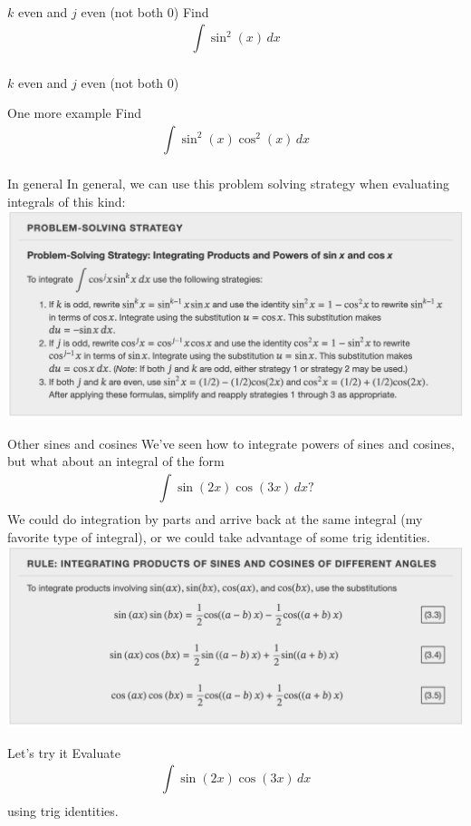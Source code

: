 \documentclass[presentation]{beamer}
\begin{document}
\begin{frame}[label={sec:org14f1970}]{\(k\) even and \(j\) even (not both 0)}
Find
\[
\int\limits_{}^{}\sin^2 \left( x \right)\,dx \]
\vspace{10in}
\end{frame}

\begin{frame}[label={sec:orga2c3091}]{\(k\) even and \(j\) even (not both 0)}
\end{frame}

\begin{frame}[label={sec:org4cc009f}]{One more example}
Find
\[
\int\limits_{}^{} \sin^2 \left( x \right)\cos^2 \left( x \right)\,dx
\]
\vspace{10in}
\end{frame}

\begin{frame}[label={sec:org6db8377}]{In general}
In general, we can use this problem solving strategy when evaluating
integrals of this kind:
\includegraphics[width=\textwidth]{../img/day018-01.png}
\end{frame}

\begin{frame}[label={sec:orgf4f141b}]{Other sines and cosines}
We've seen how to integrate powers of sines and cosines, but what
about an integral of the form
\[
\int\limits_{}^{} \sin \left( 2x \right)\cos \left( 3x \right)\,dx? \]
We could do integration by parts and arrive back at the same integral
(my favorite type of integral), or we could take advantage of some
trig identities.
\includegraphics[width=\textwidth]{../img/day018-02.png}
\end{frame}

\begin{frame}[label={sec:orgc6cfe2e}]{Let's try it}
Evaluate
\[\int\limits_{}^{} \sin \left( 2x \right)\cos \left( 3x \right)\,dx
\]
using trig identities.
\vspace{10in}
\end{frame}
\end{document}
